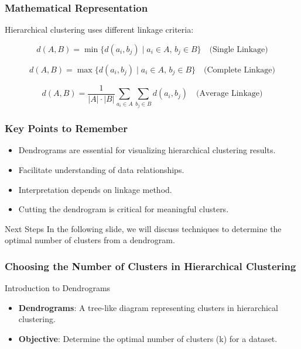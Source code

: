 \documentclass[aspectratio=169]{beamer}
\begin{document}
\begin{frame}[fragile]
    \frametitle{Mathematical Representation}
    Hierarchical clustering uses different linkage criteria:

    \begin{equation}
        d(A, B) = \min \{d(a_i, b_j)\;|\; a_i \in A,\, b_j \in B\} \quad \text{(Single Linkage)}
    \end{equation}
    
    \begin{equation}
        d(A, B) = \max \{d(a_i, b_j)\;|\; a_i \in A,\, b_j \in B\} \quad \text{(Complete Linkage)}
    \end{equation}
    
    \begin{equation}
        d(A, B) = \frac{1}{|A|\cdot|B|} \sum_{a_i \in A} \sum_{b_j \in B} d(a_i, b_j) \quad \text{(Average Linkage)}
    \end{equation}
\end{frame}

\begin{frame}[fragile]
    \frametitle{Key Points to Remember}
    \begin{itemize}
        \item Dendrograms are essential for visualizing hierarchical clustering results.
        \item Facilitate understanding of data relationships.
        \item Interpretation depends on linkage method.
        \item Cutting the dendrogram is critical for meaningful clusters.
    \end{itemize}
    \begin{block}{Next Steps}
        In the following slide, we will discuss techniques to determine the optimal number of clusters from a dendrogram.
    \end{block}
\end{frame}

\begin{frame}[fragile]
    \frametitle{Choosing the Number of Clusters in Hierarchical Clustering}
    \begin{block}{Introduction to Dendrograms}
        \begin{itemize}
            \item \textbf{Dendrograms}: A tree-like diagram representing clusters in hierarchical clustering.
            \item \textbf{Objective}: Determine the optimal number of clusters (k) for a dataset.
        \end{itemize}
    \end{block}
\end{frame}
\end{document}
